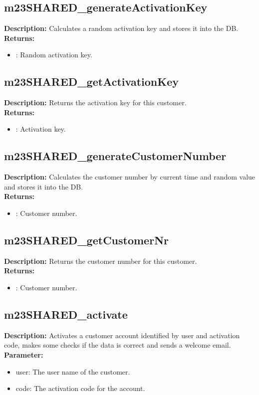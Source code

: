 \subsection{m23SHARED\_generateActivationKey}
\textbf{Description:} Calculates a random activation key and stores it into the DB.\\
\textbf{Returns:}
\begin{itemize}
\item : Random activation key.
\end{itemize}

\subsection{m23SHARED\_getActivationKey}
\textbf{Description:} Returns the activation key for this customer.\\
\textbf{Returns:}
\begin{itemize}
\item : Activation key.
\end{itemize}

\subsection{m23SHARED\_generateCustomerNumber}
\textbf{Description:} Calculates the customer number by current time and random value and stores it into the DB.\\
\textbf{Returns:}
\begin{itemize}
\item : Customer number.
\end{itemize}

\subsection{m23SHARED\_getCustomerNr}
\textbf{Description:} Returns the customer number for this customer.\\
\textbf{Returns:}
\begin{itemize}
\item : Customer number.
\end{itemize}

\subsection{m23SHARED\_activate}
\textbf{Description:} Activates a customer account identified by user and activation code, makes some checks if the data is correct and sends a welcome email.\\
\textbf{Parameter:}
\begin{itemize}
\item user: The user name of the customer.
\item code: The activation code for the account.
\end{itemize}

